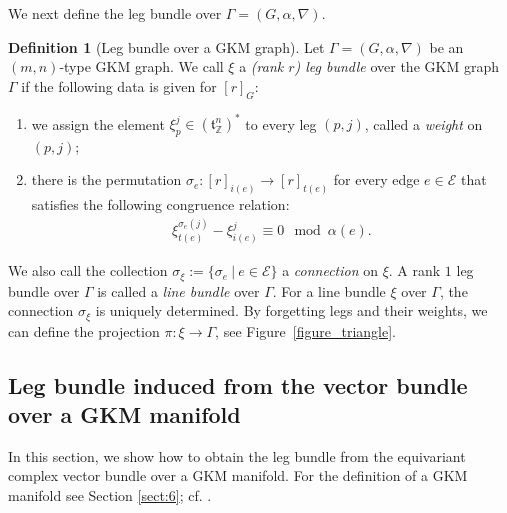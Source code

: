 \documentclass[12pt]{amsart}
\theoremstyle{definition}
\newtheorem{definition}[theorem]{Definition}
\theoremstyle{remark}
\numberwithin{equation}{section}
\begin{document}
We next define the leg bundle over $\Gamma=(G,\alpha,\nabla)$.
\begin{definition}[Leg bundle over a GKM graph]
\label{def-leg-bdl}
Let $\Gamma=(G, \alpha, \nabla)$ be an $(m,n)$-type GKM graph.
We call $\xi$ a {\it (rank $r$) leg bundle} over the GKM graph $\Gamma$ if
the following data is given for $[r]_{G}$:
\begin{enumerate}
\item we assign the element $\xi_{p}^{j}\in (\mathfrak{t}_{\mathbb{Z}}^{n})^{*}$ to every leg $(p,j)$, called a {\it weight} on $(p,j)$;
\item there is the permutation $\sigma_{e}:[r]_{i(e)}\to [r]_{t(e)}$ for every edge $e\in \mathcal{E}$ that satisfies the following congruence relation:
\begin{align*}
\xi_{t(e)}^{\sigma_{e}(j)}-\xi_{i(e)}^{j}\equiv 0 \mod \alpha(e).
\end{align*}
\end{enumerate}
\end{definition}

We also call the collection $\sigma_{\xi}:=\{\sigma_{e}\ |\ e\in \mathcal{E}\}$ a {\it connection} on $\xi$.
A rank $1$ leg bundle over $\Gamma$ is called a {\it line bundle} over $\Gamma$.
For a line bundle $\xi$ over $\Gamma$, the connection $\sigma_{\xi}$ is uniquely determined.
By forgetting legs and their weights, we can define the projection $\pi:\xi\to \Gamma$, see Figure~\ref{figure_triangle}.


\subsection{Leg bundle induced from the vector bundle over a GKM manifold}
\label{sect:2.3}

In this section, we show how to obtain the leg bundle from the equivariant complex vector bundle over a GKM manifold.
For the definition of a GKM manifold see Section \ref{sect:6}; cf. \cite{GKM,GZ}.
\end{document}
